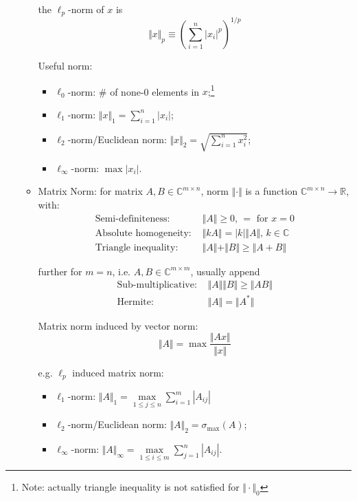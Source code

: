\begin{itemize}[topsep=6pt,itemsep=4pt]
\begin{itemize}[topsep=2pt,itemsep=0pt]
        
        the $ \ell_p $-norm of $ x $ is
        \begin{equation}
            \Vert x\Vert _p\equiv \left( \sum_{i=1}^n| x_i|^p \right)^{1/p}
        \end{equation}

        Useful norm:
        \begin{itemize}[topsep=2pt,itemsep=2pt]
            \item $ \ell_0$-norm: \# of none-0 elements in $ x $;\footnote{Note: actually triangle inequality is not satisfied for $ \Vert \cdot \Vert _0 $}
            \item $ \ell_1 $-norm: $ \Vert x\Vert _1=\sum_{i=1}^n|x_i| $;
            \item $ \ell_2 $-norm/Euclidean norm: $ \Vert x\Vert _2=\sqrt{\sum_{i=1}^n x_i^2}  $;
            \item $ \ell_\infty $-norm: $ \max |x_i| $.
        \end{itemize}
        \item Matrix Norm:  for matrix $ A,B\in \mathbb{C}^{m\times n} $, norm $ \Vert \cdot \Vert  $ is a function $ \mathbb{C}^{m\times n}\to \mathbb{R} $, with:
        \begin{align}
            \text{Semi-definiteness: }&\Vert A \Vert \geq 0,\, =\text{ for }x=0\\
            \text{Absolute homogeneity: }&\Vert kA \Vert = |k|\Vert A \Vert,\, k\in \mathbb{C} \\
            \text{Triangle inequality: }& \Vert A \Vert + \Vert B \Vert \geq \Vert A+B \Vert 
        \end{align}

        further for $ m=n $, i.e. $ A,B\in \mathbb{C}^{m\times m} $, usually append
        \begin{align}
            \text{Sub-multiplicative: }&\Vert A \Vert \Vert B \Vert \geq \Vert AB \Vert \\
            \text{Hermite: }&\Vert A \Vert =\Vert A^* \Vert 
        \end{align}

        Matrix norm induced by vector norm:
        \begin{equation}
            \Vert A \Vert =\max \dfrac{\Vert Ax \Vert }{\Vert x \Vert } 
        \end{equation}
        
        e.g. $ \ell_p $ induced matrix norm:
        \begin{itemize}[topsep=2pt,itemsep=2pt]
            \item $ \ell_1 $-norm: $ \Vert A\Vert _1=\mathop{\max}\limits_{1\leq j\leq n}\sum\limits_{i=1}^m|A_{ij}| $
            \item $ \ell_2 $-norm/Euclidean norm: $ \Vert A\Vert _2=\sigma_{\max}(A) $;
            \item $ \ell_\infty $-norm: $ \Vert A\Vert _\infty=\mathop{\max}\limits_{1\leq i\leq m}\sum\limits_{j=1}^n|A_{ij}| $.
        \end{itemize}


\end{itemize}
\end{itemize}
